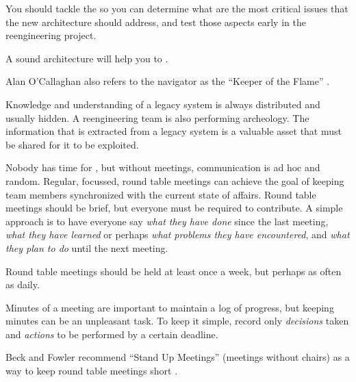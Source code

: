 \documentclass[a4paper,10pt,twoside]{book}
\begin{document}
You should tackle the  so you can determine what are the most critical issues that the new architecture should address, and test those aspects early in the reengineering project.

A sound architecture will help you to .

Alan O'Callaghan also refers to the navigator as the ``Keeper of the Flame'' \cite{Ocal99a}.




\discussion
Knowledge and understanding of a legacy system is always distributed and usually hidden. A reengineering team is also performing archeology. The information that is extracted from a legacy system is a valuable asset that must be shared for it to be exploited.

Nobody has time for , but without meetings, communication is ad hoc and random. Regular, focussed, round table meetings can achieve the goal of keeping team members synchronized with the current state of affairs. Round table meetings should be brief, but everyone must be required to contribute. A simple approach is to have everyone say \emph{what they have done} since the last meeting, \emph{what they have learned} or perhaps \emph{what problems they have encountered}, and \emph{what they plan to do} until the next meeting.

Round table meetings should be held at least once a week, but perhaps as often as daily.

Minutes of a meeting are important to maintain a log of progress, but keeping minutes can be an unpleasant task. To keep it simple, record only \emph{decisions} taken and \emph{actions} to be performed by a certain deadline.

Beck and Fowler recommend ``Stand Up Meetings'' (meetings without chairs) as a way to keep round table meetings short \cite{Beck01a}.

\end{document}
